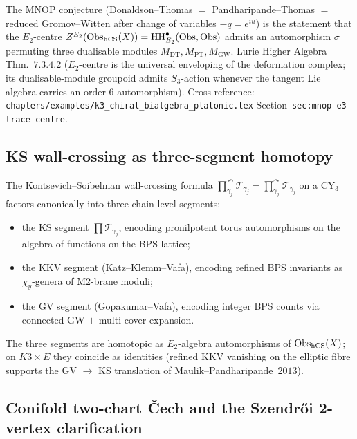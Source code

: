 \begin{theorem}\ClaimStatusTheorem
\label{wn:thm:plat-mnop-e2-centre}
The MNOP conjecture (Donaldson--Thomas $=$ Pandharipande--Thomas $=$
reduced Gromov--Witten after change of variables $-q = e^{iu}$) is the
statement that the $E_2$-centre
$Z^{E_2}(\mathrm{Obs}_{\mathrm{hCS}}(X)) = \mathrm{HH}^\bullet_{E_2}(\mathrm{Obs}, \mathrm{Obs})$ admits
an automorphism $\sigma$ permuting three dualisable modules
$M_{\mathrm{DT}}, M_{\mathrm{PT}}, M_{\mathrm{GW}}$. Lurie Higher Algebra
Thm.~$7.3.4.2$ ($E_2$-centre is the universal enveloping of the
deformation complex; its dualisable-module groupoid admits $S_3$-action
whenever the tangent Lie algebra carries an order-$6$ automorphism). Cross-reference:
\texttt{chapters/examples/k3\_chiral\_bialgebra\_platonic.tex}
Section~\texttt{sec:mnop-e3-trace-centre}.
\end{theorem}

\subsection{KS wall-crossing as three-segment homotopy}
\label{wn:subsec:plat-ks-wall-crossing}

\begin{theorem}\ClaimStatusTheorem
\label{wn:thm:plat-ks-three-segment}
The Kontsevich--Soibelman wall-crossing formula
$\prod_{\gamma_j}^\curvearrowleft \mathcal{T}_{\gamma_j}
= \prod_{\gamma_j}^\curvearrowright \mathcal{T}_{\gamma_j}$ on a CY$_3$
factors canonically into three chain-level segments:
\begin{itemize}
\item the KS segment $\prod \mathcal{T}_{\gamma_j}$, encoding pronilpotent
torus automorphisms on the algebra of functions on the BPS lattice;
\item the KKV segment (Katz--Klemm--Vafa), encoding refined BPS invariants
as $\chi_y$-genera of M$2$-brane moduli;
\item the GV segment (Gopakumar--Vafa), encoding integer BPS counts
via connected GW $+$ multi-cover expansion.
\end{itemize}
The three segments are homotopic as $E_2$-algebra automorphisms of
$\mathrm{Obs}_{\mathrm{hCS}}(X)$; on $K3 \times E$ they coincide as identities
(refined KKV vanishing on the elliptic fibre supports the GV
$\rightarrow$ KS translation of Maulik--Pandharipande~$2013$).
\end{theorem}

\subsection{Conifold two-chart \v{C}ech and the Szendr\H{o}i 2-vertex
clarification}
\label{wn:subsec:plat-conifold-szendroi}

